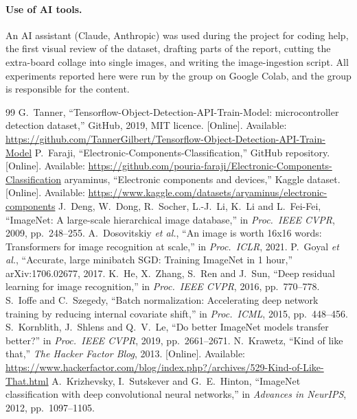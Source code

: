 \documentclass[11pt,a4paper]{article}
\begin{document}
\paragraph{Use of AI tools.} An AI assistant (Claude, Anthropic) was used during the project for coding help, the first visual review of the dataset, drafting parts of the report, cutting the extra-board collage into single images, and writing the image-ingestion script. All experiments reported here were run by the group on Google Colab, and the group is responsible for the content.

\begin{thebibliography}{99}\small
{} G.~Tanner, ``Tensorflow-Object-Detection-API-Train-Model: microcontroller detection dataset,'' GitHub, 2019, MIT licence. [Online]. Available: \url{https://github.com/TannerGilbert/Tensorflow-Object-Detection-API-Train-Model}
 P.~Faraji, ``Electronic-Components-Classification,'' GitHub repository. [Online]. Available: \url{https://github.com/pouria-faraji/Electronic-Components-Classification}
 aryaminus, ``Electronic components and devices,'' Kaggle dataset. [Online]. Available: \url{https://www.kaggle.com/datasets/aryaminus/electronic-components}
 J.~Deng, W.~Dong, R.~Socher, L.-J.~Li, K.~Li and L.~Fei-Fei, ``ImageNet: A large-scale hierarchical image database,'' in \emph{Proc.\ IEEE CVPR}, 2009, pp.~248--255.
 A.~Dosovitskiy \emph{et al.}, ``An image is worth 16x16 words: Transformers for image recognition at scale,'' in \emph{Proc.\ ICLR}, 2021.
 P.~Goyal \emph{et al.}, ``Accurate, large minibatch SGD: Training ImageNet in 1 hour,'' arXiv:1706.02677, 2017.
 K.~He, X.~Zhang, S.~Ren and J.~Sun, ``Deep residual learning for image recognition,'' in \emph{Proc.\ IEEE CVPR}, 2016, pp.~770--778.
 S.~Ioffe and C.~Szegedy, ``Batch normalization: Accelerating deep network training by reducing internal covariate shift,'' in \emph{Proc.\ ICML}, 2015, pp.~448--456.
 S.~Kornblith, J.~Shlens and Q.~V.~Le, ``Do better ImageNet models transfer better?'' in \emph{Proc.\ IEEE CVPR}, 2019, pp.~2661--2671.
 N.~Krawetz, ``Kind of like that,'' \emph{The Hacker Factor Blog}, 2013. [Online]. Available: \url{https://www.hackerfactor.com/blog/index.php?/archives/529-Kind-of-Like-That.html}
 A.~Krizhevsky, I.~Sutskever and G.~E.~Hinton, ``ImageNet classification with deep convolutional neural networks,'' in \emph{Advances in NeurIPS}, 2012, pp.~1097--1105.

\end{thebibliography}
\end{document}
